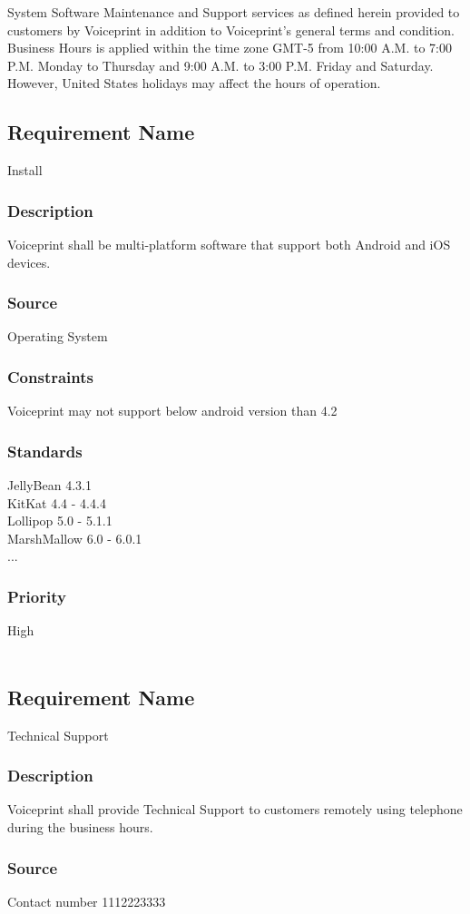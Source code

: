 System Software Maintenance and Support services as defined herein provided to customers by Voiceprint in addition to Voiceprint's general terms and condition. Business Hours is applied within the time zone GMT-5 from 10:00 A.M. to 7:00 P.M. Monday to Thursday and 9:00 A.M. to 3:00 P.M. Friday and Saturday. However, United States holidays may affect the hours of operation.


\subsection{Requirement Name}
Install
\subsubsection{Description}
Voiceprint shall be multi-platform software that support both Android and iOS devices. 
\subsubsection{Source}
Operating System
\subsubsection{Constraints}
Voiceprint may not support below android version than 4.2 
\subsubsection{Standards}
JellyBean 4.3.1 \\
KitKat 4.4 - 4.4.4 \\
Lollipop 5.0 - 5.1.1 \\
MarshMallow 6.0 - 6.0.1 \\
...
\subsubsection{Priority}
High
\\
\\
\subsection{Requirement Name}
Technical Support
\subsubsection{Description}
Voiceprint shall provide Technical Support to customers remotely using telephone during the business hours.
\subsubsection{Source}
Contact number 1112223333
